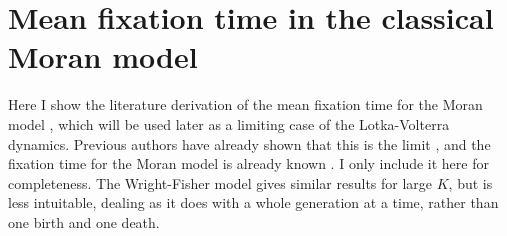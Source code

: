 \section{Mean fixation time in the classical Moran model}
Here I show the literature derivation of the mean fixation time for the Moran model \cite{Moran1962}, which will be used later as a limiting case of the Lotka-Volterra dynamics. 
Previous authors have already shown that this is the limit \cite{Lin2012,Constable2015,Chotibut2015}, and the fixation time for the Moran model is already known \cite{Moran1962}. I only include it here for completeness. 
The Wright-Fisher model gives similar results for large $K$, but is less intuitable, dealing as it does with a whole generation at a time, rather than one birth and one death. %

